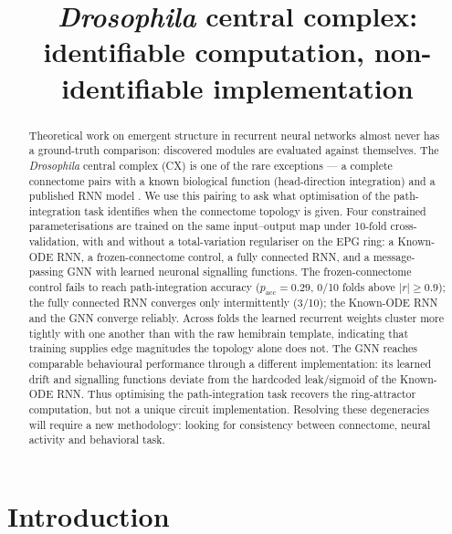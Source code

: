 \documentclass[11pt]{article}
\title{\textbf{\emph{Drosophila} central complex: identifiable computation, non-identifiable implementation}}
\author{}
\date{}
\begin{document}
\maketitle
\begin{abstract}
Theoretical work on emergent structure in recurrent neural networks
almost never has a ground-truth comparison: discovered modules are
evaluated against themselves. The \emph{Drosophila} central complex
(CX) is one of the rare exceptions --- a complete connectome
\citep{hulse2021} pairs with a known biological function
(head-direction integration) and a published RNN model
\citep{vafidis2022}. We use this pairing to ask what optimisation of the path-integration
task identifies when the connectome topology is given. Four constrained
parameterisations are trained on the same input--output map under
10-fold cross-validation, with and without a total-variation
regulariser on the EPG ring:
a Known-ODE RNN, a frozen-connectome control, a fully connected RNN,
and a message-passing GNN with learned neuronal signalling functions.
The frozen-connectome control fails to reach path-integration accuracy ($p_{\mathrm{acc}} = 0.29$, 0/10 folds above $|r| \ge 0.9$);
the fully connected RNN converges only intermittently (3/10); the Known-ODE RNN and
the GNN converge reliably. Across folds the learned
recurrent weights cluster more tightly with one another than with the
raw hemibrain template, indicating that training supplies edge
magnitudes the topology alone does not. The GNN reaches comparable
behavioural performance through a different implementation: its
learned drift and signalling functions deviate from the hardcoded
leak/sigmoid of the Known-ODE RNN. Thus optimising the
path-integration task recovers the ring-attractor computation, but
not a unique circuit implementation. Resolving these degeneracies will require a new methodology: looking for consistency between connectome, neural activity and behavioral task. 
\end{abstract}

\section{Introduction}
\end{document}
